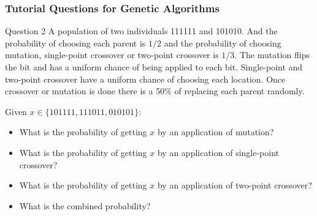 \documentclass[aspectratio=169, 10pt]{beamer}
\begin{document}
\begin{frame}
    \frametitle{Tutorial Questions for Genetic Algorithms}

    \begin{block}{Question 2}
        A population of two individuals 111111 and 101010. 
        And the probability of choosing each parent is $1/2$ and the probability of choosing mutation, 
        single-point crossover or two-point crossover is $1/3$. 
        The mutation flips the bit and has a uniform chance of being applied to each bit. 
        Single-point and two-point crossover have a uniform chance of choosing each location. 
        Once crossover or mutation is done there is a 50\% of replacing each parent randomly.
    \end{block}

    Given $x \in \{101111, 111011, 010101\}$:
    \begin{itemize}
        \item What is the probability of getting $x$ by an application of mutation?
        \item What is the probability of getting $x$ by an application of single-point crossover?
        \item What is the probability of getting $x$ by an application of two-point crossover?
        \item What is the combined probability?
    \end{itemize}
    
\end{frame}
\end{document}
